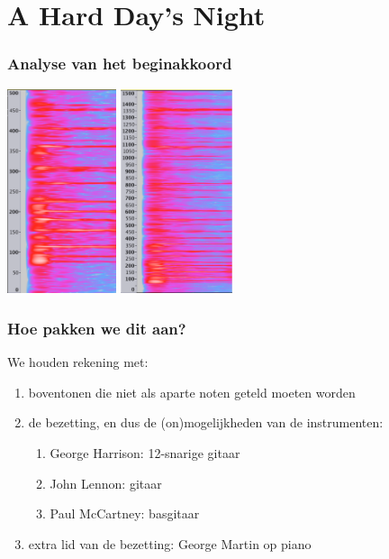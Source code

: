 \documentclass[compress, darktitle, framenumber, totalframenumber]{beamer}
\begin{document}
\section{A Hard Day's Night}

\begin{frame}
  \frametitle{Analyse van het beginakkoord}

  \begin{center}
    \includegraphics[height=6cm]{images/beatles-500} \qquad \includegraphics[height=6cm]{images/beatles-1500}
  \end{center}
\end{frame}

\begin{frame}
  \frametitle{Hoe pakken we dit aan?}

  We houden rekening met:
  \begin{enumerate}
    \item boventonen die niet als aparte noten geteld moeten worden \pause
    \item de bezetting, en dus de (on)mogelijkheden van de instrumenten:
      \begin{enumerate}
        \item George Harrison: 12-snarige gitaar
        \item John Lennon: gitaar
        \item Paul McCartney: basgitaar
      \end{enumerate} \pause
    \item extra lid van de bezetting: \alert{George Martin op piano}
  \end{enumerate}
\end{frame}
\end{document}
